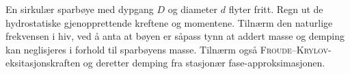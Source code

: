 En sirkulær sparbøye med dypgang $D$ og diameter $d$ flyter fritt.
Regn ut de hydrostatiske gjenopprettende kreftene og momentene.
Tilnærm den naturlige frekvensen i hiv, ved å anta at bøyen er såpass tynn at addert masse og demping kan neglisjeres i forhold til sparbøyens masse.
Tilnærm også \textsc{Froude}--\textsc{Krylov}-eksitasjonskraften og deretter demping fra stasjonær fase-approksimasjonen.
